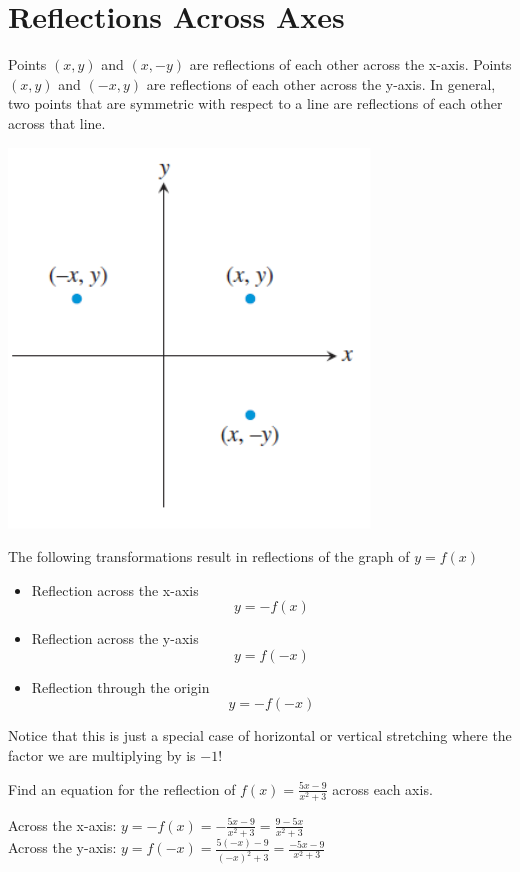 \documentclass[handout, noauthor, nooutcomes]{ximera}
\begin{document}
\section{Reflections Across Axes}
Points $(x,y)$ and $(x,-y)$ are reflections of each other across the x-axis. Points $(x, y)$ and $(-x, y)$ are reflections of each other across the y-axis. In general, two points that are symmetric with respect to a line are reflections of each other across that line.
\begin{image}
\includegraphics[scale=0.65]{images/reflectiongraph.png}
\end{image}
\begin{callout}
The following transformations result in reflections of the graph of $y = f(x)$
\begin{itemize}
\item Reflection across the x-axis
\[
y=-f(x)
\]
\item Reflection across the y-axis
\[
y=f(-x)
\]
\item Reflection through the origin
\[
y=-f(-x)
\]
\end{itemize}
\end{callout}

Notice that this is just a special case of horizontal or vertical stretching where the factor we are multiplying by is $-1$!

\begin{example}
Find an equation for the reflection of $f(x) = \frac{5x - 9}{x^2+3}$ across each axis.
\\
\begin{explanation}
Across the x-axis: $y = -f(x) = -\frac{5x-9}{x^2+3}=\frac{9-5x}{x^2+3}$
\\
Across the y-axis: $y = f(-x) = \frac{5(-x)-9}{(-x)^2+3}=\frac{-5x-9}{x^2+3}$
\end{explanation}
\end{example}
\end{document}
